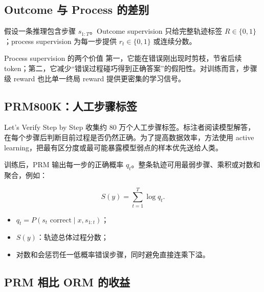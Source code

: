 \documentclass[a4paper]{article}
\begin{document}
\subsection{Outcome 与 Process 的差别}

假设一条推理包含步骤 $s_{1:T}$。Outcome supervision 只给完整轨迹标签 $R\in\{0,1\}$；process supervision 为每一步提供 $r_t\in\{0,1\}$ 或连续分数。



\begin{importantbox}{Process supervision 的两个价值}
第一，它能在错误刚出现时剪枝，节省后续 token；第二，它减少“错误过程碰巧得到正确答案”的假阳性。对训练而言，步骤级 reward 也比单一终局 reward 提供更密集的学习信号。
\end{importantbox}

\subsection{PRM800K：人工步骤标签}

Let's Verify Step by Step 收集约 80 万个人工步骤标签。标注者阅读模型解答，在每个步骤后判断目前过程是否仍然正确。为了提高数据效率，方法使用 active learning，把最有区分度或最可能暴露模型弱点的样本优先送给人类。


训练后，PRM 输出每一步的正确概率 $q_t$。整条轨迹可用最弱步骤、乘积或对数和聚合，例如：

$$
S(y)=\sum_{t=1}^{T}\log q_t.
$$

\begin{itemize}
    \item $q_t=P(s_t\text{ correct}\mid x,s_{1:t})$；
    \item $S(y)$：轨迹总体过程分数；
    \item 对数和会惩罚任一低概率错误步骤，同时避免直接连乘下溢。
\end{itemize}

\subsection{PRM 相比 ORM 的收益}
\end{document}
